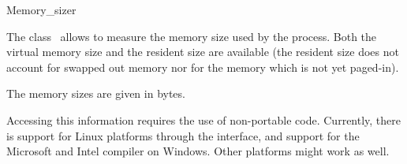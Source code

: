 
\begin{ccRefClass}{Memory_sizer}

\ccDefinition

The class \ccRefName\ allows to measure the memory size used by the process.
Both the virtual memory size and the resident size are available (the resident
size does not account for swapped out memory nor for the memory which is not
yet paged-in).


\ccTypes
\ccThreeToTwo

The memory sizes are given in bytes.


\ccCreation

\ccPropagateThreeToTwoColumns


\ccOperations

\ccGlue
{}


\ccImplementation

Accessing this information requires the use of non-portable code.
Currently, there is support for Linux platforms through the 
interface, and support for the Microsoft and Intel compiler on Windows.  
Other platforms might work as well.

\end{ccRefClass}

